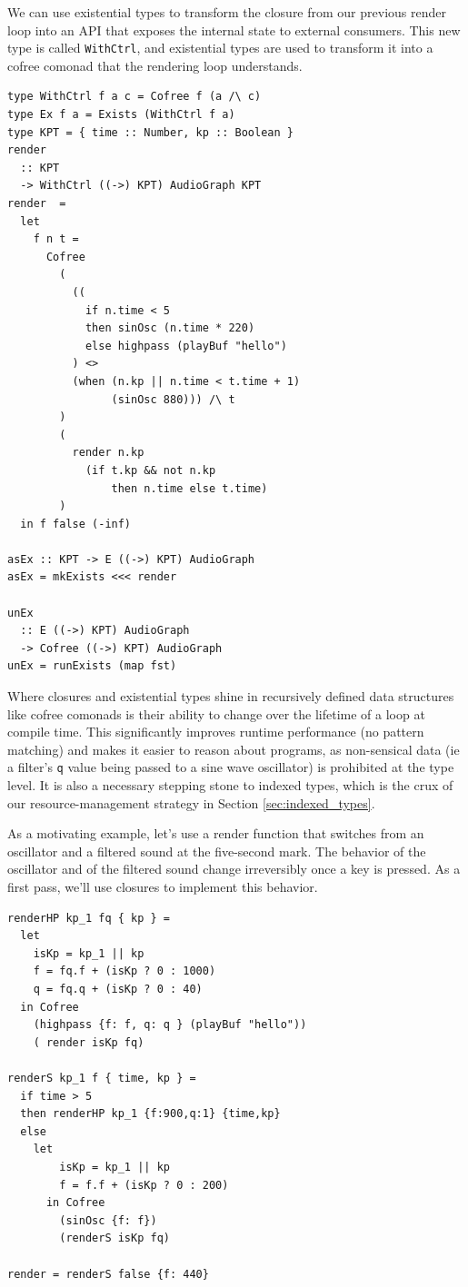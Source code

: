 \documentclass{article}
\begin{document}
We can use existential types to transform the closure from our previous render loop into an API that exposes the internal state to external consumers. This new type is called \texttt{WithCtrl}, and existential types are used to transform it into a cofree comonad that the rendering loop understands.

\lstset{language=Haskell, style=psstyle}
\begin{lstlisting}
type WithCtrl f a c = Cofree f (a /\ c)
type Ex f a = Exists (WithCtrl f a)
type KPT = { time :: Number, kp :: Boolean }
render
  :: KPT
  -> WithCtrl ((->) KPT) AudioGraph KPT
render  =
  let
    f n t =
      Cofree
        (
          ((
            if n.time < 5
            then sinOsc (n.time * 220)
            else highpass (playBuf "hello")
          ) <>
          (when (n.kp || n.time < t.time + 1)
                (sinOsc 880))) /\ t
        )
        (
          render n.kp
            (if t.kp && not n.kp
                then n.time else t.time)
        )
  in f false (-inf)

asEx :: KPT -> E ((->) KPT) AudioGraph
asEx = mkExists <<< render

unEx
  :: E ((->) KPT) AudioGraph
  -> Cofree ((->) KPT) AudioGraph
unEx = runExists (map fst)
\end{lstlisting}

Where closures and existential types shine in recursively defined data structures like cofree comonads is their ability to change over the lifetime of a loop at compile time. This significantly improves runtime performance (no pattern matching) and makes it easier to reason about programs, as non-sensical data (ie a filter's \texttt{q} value being passed to a sine wave oscillator) is prohibited at the type level. It is also a necessary stepping stone to indexed types, which is the crux of our resource-management strategy in Section \ref{sec:indexed_types}.

As a motivating example, let's use a render function that switches from an oscillator and a filtered sound at the five-second mark. The behavior of the oscillator and of the filtered sound change irreversibly once a key is pressed. As a first pass, we'll use closures to implement this behavior.

\lstset{language=Haskell, style=psstyle}
\begin{lstlisting}
renderHP kp_1 fq { kp } =
  let
    isKp = kp_1 || kp
    f = fq.f + (isKp ? 0 : 1000)
    q = fq.q + (isKp ? 0 : 40)
  in Cofree
    (highpass {f: f, q: q } (playBuf "hello"))
    ( render isKp fq)

renderS kp_1 f { time, kp } =
  if time > 5
  then renderHP kp_1 {f:900,q:1} {time,kp}
  else
    let
        isKp = kp_1 || kp
        f = f.f + (isKp ? 0 : 200)
      in Cofree
        (sinOsc {f: f})
        (renderS isKp fq)

render = renderS false {f: 440}
\end{lstlisting}
\end{document}
